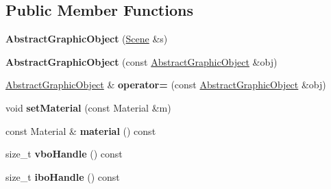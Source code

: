 \subsection*{Public Member Functions}
\begin{DoxyCompactItemize}
\item 
\hypertarget{class_tempest_1_1_abstract_graphic_object_ab95ed0454696eeb5b8cbac6f16fb1e2e}{{\bfseries Abstract\+Graphic\+Object} (\hyperlink{class_tempest_1_1_abstract_scene}{Scene} \&s)}\label{class_tempest_1_1_abstract_graphic_object_ab95ed0454696eeb5b8cbac6f16fb1e2e}

\item 
\hypertarget{class_tempest_1_1_abstract_graphic_object_ad46a5a549a111d2b5ae7820c27c144df}{{\bfseries Abstract\+Graphic\+Object} (const \hyperlink{class_tempest_1_1_abstract_graphic_object}{Abstract\+Graphic\+Object} \&obj)}\label{class_tempest_1_1_abstract_graphic_object_ad46a5a549a111d2b5ae7820c27c144df}

\item 
\hypertarget{class_tempest_1_1_abstract_graphic_object_ae618d46ffc4dc79312b855bc7e221472}{\hyperlink{class_tempest_1_1_abstract_graphic_object}{Abstract\+Graphic\+Object} \& {\bfseries operator=} (const \hyperlink{class_tempest_1_1_abstract_graphic_object}{Abstract\+Graphic\+Object} \&obj)}\label{class_tempest_1_1_abstract_graphic_object_ae618d46ffc4dc79312b855bc7e221472}

\item 
\hypertarget{class_tempest_1_1_abstract_graphic_object_a7cb2ddbb623de7d3a7249bd893f8e5fd}{void {\bfseries set\+Material} (const Material \&m)}\label{class_tempest_1_1_abstract_graphic_object_a7cb2ddbb623de7d3a7249bd893f8e5fd}

\item 
\hypertarget{class_tempest_1_1_abstract_graphic_object_a55e919e5282a8520a00b77f4b986fe52}{const Material \& {\bfseries material} () const }\label{class_tempest_1_1_abstract_graphic_object_a55e919e5282a8520a00b77f4b986fe52}

\item 
\hypertarget{class_tempest_1_1_abstract_graphic_object_a3760ef7464f02d2aacbff52769400b80}{size\+\_\+t {\bfseries vbo\+Handle} () const }\label{class_tempest_1_1_abstract_graphic_object_a3760ef7464f02d2aacbff52769400b80}

\item 
\hypertarget{class_tempest_1_1_abstract_graphic_object_a97052f330b6bd973082b29fce309b8e0}{size\+\_\+t {\bfseries ibo\+Handle} () const }\label{class_tempest_1_1_abstract_graphic_object_a97052f330b6bd973082b29fce309b8e0}

\end{DoxyCompactItemize}
